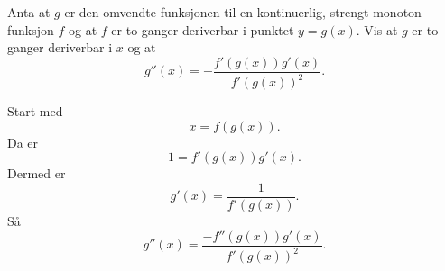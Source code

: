 \documentclass[11pt, norsk]{article}
\begin{document}
\begin{oppg}
Anta at $g$ er den omvendte funksjonen til en kontinuerlig, strengt monoton funksjon $f$ og at $f$ er to ganger deriverbar i punktet $y=g(x)$. Vis at $g$ er to ganger deriverbar i $x$ og at 
$$
g''(x) = -\frac{f'(g(x))g'(x)}{f'(g(x))^2}.
$$
\end{oppg}
\begin{losn}
Start med
$$
x=f(g(x)).
$$
Da er 
$$
1 = f'(g(x))g'(x).
$$
Dermed er
$$
g'(x) = \frac{1}{f'(g(x))}.
$$
Så 
$$
g''(x) = \frac{-f''(g(x))g'(x)}{f'(g(x))^2}.
$$

\end{losn}
\end{document}
